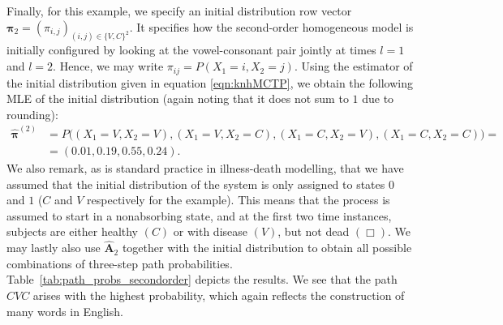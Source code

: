 \documentclass[11pt, a4paper]{article}
\numberwithin{equation}{section}
\theoremstyle{plain}
\theoremstyle{definition}
\begin{document}
Finally, for this example, we specify an initial distribution row vector $\boldsymbol{\pi}_{2} = (\pi_{i,j})_{(i,j)\in\{V,C\}^{2}}$. It specifies how the second-order homogeneous model is initially configured by looking at the vowel-consonant pair jointly at times $l=1$ and $l=2$. Hence, we may write $\pi_{ij}=P(X_{1}=i,X_{2}=j).$ Using the estimator of the initial distribution given in equation \eqref{eqn:knhMCTP}, we obtain the following MLE of the initial distribution (again noting that it does not sum to $1$ due to rounding): 
\begin{align*}
    \boldsymbol{\hat{\pi}}^{(2)}  &= P\big((X_1=V, X_{2}=V), (X_{1}=V,X_{2}=C),(X_{1}=C,X_{2}=V),(X_{1}=C,X_{2}=C)\big) = \\
    &= (0.01,0.19,0.55,0.24).
\end{align*}
We also remark, as is standard practice in illness-death modelling, that we have assumed that the initial distribution of the system is only assigned to states $0$ and $1$ ($C$ and $V$ respectively for the example). This means that the process is assumed to start in a nonabsorbing state, and at the first two time instances, subjects are either healthy $(C)$ or with disease $(V)$, but not  dead $(\mathcal{\Box}).$ We may lastly also use $\boldsymbol{  \widehat A}_2$ together with the initial distribution to obtain all possible combinations of three-step path probabilities. Table~\ref{tab:path_probs_secondorder} depicts the results. We see that the path $CVC$ arises with the highest probability, which again reflects the construction of many words in English. 
\end{document}
